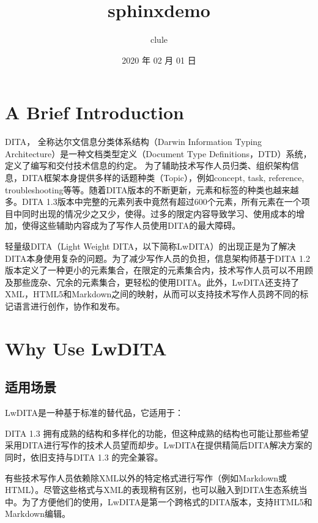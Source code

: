 \documentclass[letterpaper,10pt,english]{sphinxmanual}
\title{sphinxdemo}
\date{2020 年 02 月 01 日}
\author{clule}
\begin{document}
\pagestyle{empty}
\sphinxmaketitle
\pagestyle{plain}
\sphinxtableofcontents
\pagestyle{normal}
\label{\detokenize{index::doc}}



\chapter{A Brief Introduction}
\label{\detokenize{chap1:a-brief-introduction}}\label{\detokenize{chap1::doc}}
DITA， 全称达尔文信息分类体系结构（Darwin Information Typing Architecture）是一种文档类型定义（Document Type Definitions，DTD）系统，定义了编写和交付技术信息的约定。
为了辅助技术写作人员归类、组织架构信息，DITA框架本身提供多样的话题种类（Topic），例如concept, task, reference, troubleshooting等等。随着DITA版本的不断更新，元素和标签的种类也越来越多。DITA 1.3版本中完整的元素列表中竟然有超过600个元素，所有元素在一个项目中同时出现的情况少之又少，使得。过多的限定内容导致学习、使用成本的增加，使得这些辅助内容成为了写作人员使用DITA的最大障碍。

轻量级DITA（Light Weight DITA，以下简称LwDITA）的出现正是为了解决DITA本身使用复杂的问题。为了减少写作人员的负担，信息架构师基于DITA 1.2版本定义了一种更小的元素集合，在限定的元素集合内，技术写作人员可以不用顾及那些庞杂、冗余的元素集合，更轻松的使用DITA。此外，LwDITA还支持了XML，HTML5和Markdown之间的映射，从而可以支持技术写作人员跨不同的标记语言进行创作，协作和发布。


\chapter{Why Use LwDITA}
\label{\detokenize{chap2:why-use-lwdita}}\label{\detokenize{chap2::doc}}

\section{适用场景}
\label{\detokenize{chap2:id1}}
LwDITA是一种基于标准的替代品，它适用于：


DITA 1.3 拥有成熟的结构和多样化的功能，但这种成熟的结构也可能让那些希望采用DITA进行写作的技术人员望而却步。LwDITA在提供精简后DITA解决方案的同时，依旧支持与DITA 1.3 的完全兼容。


有些技术写作人员依赖除XML以外的特定格式进行写作（例如Markdown或HTML）。尽管这些格式与XML的表现稍有区别，也可以融入到DITA生态系统当中。为了方便他们的使用，LwDITA是第一个跨格式的DITA版本，支持HTML5和Markdown编辑。
\end{document}
